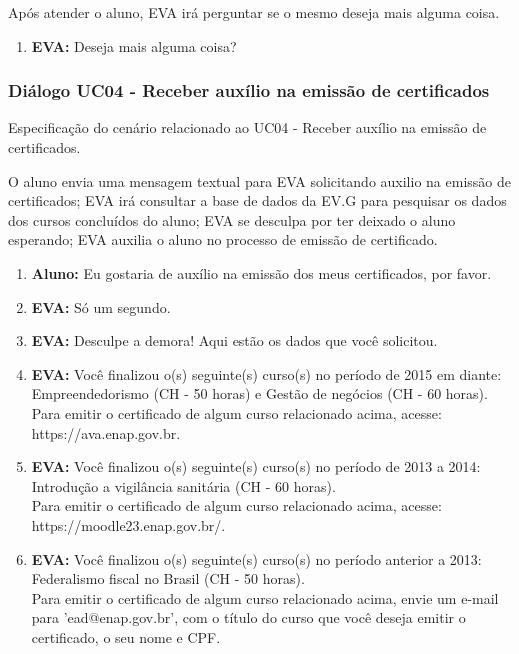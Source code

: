     
Após atender o aluno, EVA irá perguntar se o mesmo deseja mais alguma coisa.
        
\begin{enumerate}[label=\alph*)]
        \tightlist
    \item \textbf{EVA:} Deseja mais alguma coisa?
\end{enumerate}

\subsubsection{Diálogo UC04 - Receber auxílio na emissão de certificados}

Especificação do cenário relacionado ao UC04 - Receber auxílio na emissão de certificados.

    
O aluno envia uma mensagem textual para EVA solicitando auxilio na emissão de certificados; EVA irá consultar a base de dados da EV.G para pesquisar os dados dos cursos concluídos do aluno; EVA se desculpa por ter deixado o aluno esperando; EVA auxilia o aluno no processo de emissão de certificado.
        
\begin{enumerate}[label=\alph*)]
        \tightlist
            \item \textbf{Aluno:} Eu gostaria de auxílio na emissão dos meus certificados, por favor.
            \item \textbf{EVA:} Só um segundo.
            \item \textbf{EVA:} Desculpe a demora! Aqui estão os dados que você solicitou.
            \item \textbf{EVA:} Você finalizou o(s) seguinte(s) curso(s) no período de 2015 em diante: Empreendedorismo (CH - 50 horas) e Gestão de negócios (CH - 60 horas). \\
            Para emitir o certificado de algum curso relacionado acima, acesse: https://ava.enap.gov.br.
            \item \textbf{EVA:} Você finalizou o(s) seguinte(s) curso(s) no período de 2013 a 2014: Introdução a vigilância sanitária (CH - 60 horas). \\
            Para emitir o certificado de algum curso relacionado acima, acesse: https://moodle23.enap.gov.br/.
            \item \textbf{EVA:} Você finalizou o(s) seguinte(s) curso(s) no período anterior a 2013: Federalismo fiscal no Brasil (CH - 50 horas). \\
            Para emitir o certificado de algum curso relacionado acima, envie um e-mail para 'ead@enap.gov.br', com o título do curso que você deseja emitir o certificado, o seu nome e CPF.
\end{enumerate}
    
